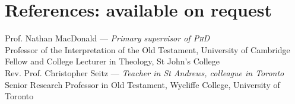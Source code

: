 \documentclass[11pt]{article}
\newcommand{\years}[1]{\marginnote{\footnotesize #1}}
\begin{document}



\section*{References: available on request}

Prof. Nathan MacDonald --- \emph{Primary supervisor of \textsc{PhD}}\\
Professor of the Interpretation of the Old Testament, University of Cambridge\\
Fellow and College Lecturer in Theology, St John's College\\


Rev. Prof. Christopher Seitz --- \emph{Teacher in St Andrews, colleague in Toronto}\\
Senior Research Professor in Old Testament, Wycliffe College, University of Toronto\\
\end{document}
